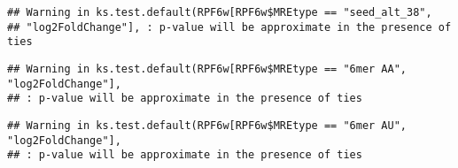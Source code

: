 \documentclass[
]{article}
\newenvironment{Shaded}{\begin{snugshade}}{\end{snugshade}}
\newcommand{\FunctionTok}[1]{\textcolor[rgb]{0.13,0.29,0.53}{\textbf{#1}}}
\newcommand{\NormalTok}[1]{#1}
\newcommand{\OtherTok}[1]{\textcolor[rgb]{0.56,0.35,0.01}{#1}}
\newcommand{\SpecialCharTok}[1]{\textcolor[rgb]{0.81,0.36,0.00}{\textbf{#1}}}
\newcommand{\StringTok}[1]{\textcolor[rgb]{0.31,0.60,0.02}{#1}}
\begin{document}
\begin{verbatim}
## Warning in ks.test.default(RPF6w[RPF6w$MREtype == "seed_alt_38",
## "log2FoldChange"], : p-value will be approximate in the presence of ties
\end{verbatim}

\begin{Shaded}
\end{Shaded}

\begin{verbatim}
## Warning in ks.test.default(RPF6w[RPF6w$MREtype == "6mer AA", "log2FoldChange"],
## : p-value will be approximate in the presence of ties
\end{verbatim}

\begin{Shaded}
\end{Shaded}

\begin{verbatim}
## Warning in ks.test.default(RPF6w[RPF6w$MREtype == "6mer AU", "log2FoldChange"],
## : p-value will be approximate in the presence of ties
\end{verbatim}
\end{document}
